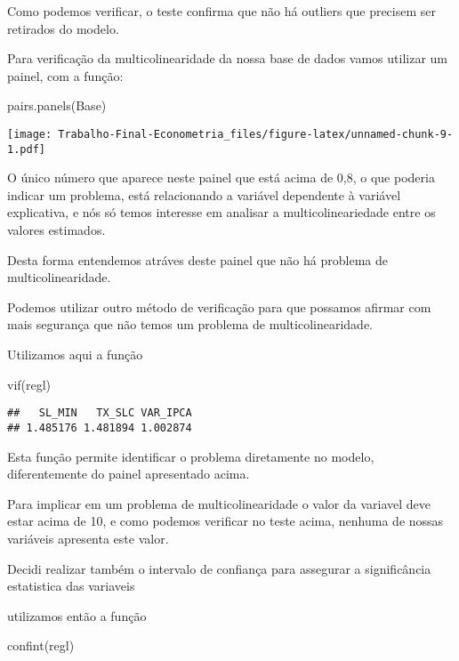 \documentclass[
]{article}
\newenvironment{Shaded}{\begin{snugshade}}{\end{snugshade}}
\newcommand{\FunctionTok}[1]{\textcolor[rgb]{0.00,0.00,0.00}{#1}}
\newcommand{\NormalTok}[1]{#1}
\begin{document}
Como podemos verificar, o teste confirma que não há outliers que
precisem ser retirados do modelo.

Para verificação da multicolinearidade da nossa base de dados vamos
utilizar um painel, com a função:

\begin{Shaded}
\begin{Highlighting}[]
\FunctionTok{pairs.panels}\NormalTok{(Base)}
\end{Highlighting}
\end{Shaded}

\texttt{[image: Trabalho-Final-Econometria\_files/figure-latex/unnamed-chunk-9-1.pdf]}

O único número que aparece neste painel que está acima de 0,8, o que
poderia indicar um problema, está relacionando a variável dependente à
variável explicativa, e nós só temos interesse em analisar a
multicolineariedade entre os valores estimados.

Desta forma entendemos atráves deste painel que não há problema de
multicolinearidade.

Podemos utilizar outro método de verificação para que possamos afirmar
com mais segurança que não temos um problema de multicolinearidade.

Utilizamos aqui a função

\begin{Shaded}
\begin{Highlighting}[]
\FunctionTok{vif}\NormalTok{(regl)}
\end{Highlighting}
\end{Shaded}

\begin{verbatim}
##   SL_MIN   TX_SLC VAR_IPCA 
## 1.485176 1.481894 1.002874
\end{verbatim}

Esta função permite identificar o problema diretamente no modelo,
diferentemente do painel apresentado acima.

Para implicar em um problema de multicolinearidade o valor da variavel
deve estar acima de 10, e como podemos verificar no teste acima, nenhuma
de nossas variáveis apresenta este valor.

Decidi realizar também o intervalo de confiança para assegurar a
significância estatistica das variaveis

utilizamos então a função

\begin{Shaded}
\begin{Highlighting}[]
\FunctionTok{confint}\NormalTok{(regl)}
\end{Highlighting}
\end{Shaded}
\end{document}
